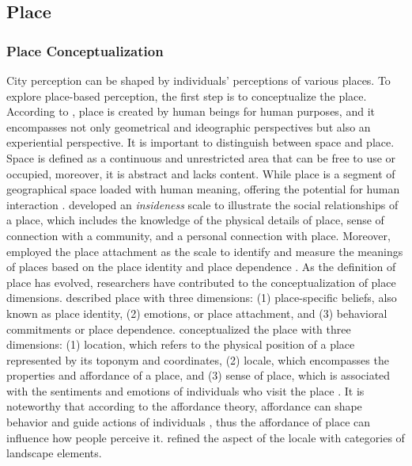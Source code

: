 \documentclass{article}
\begin{document}
\subsection{Place}
\subsubsection{Place Conceptualization}
City perception can be shaped by individuals' perceptions of various places. To explore place-based perception, the first step is to conceptualize the place. According to \cite{tuan_place_1975}, place is created by human beings for human purposes, and it encompasses not only geometrical and ideographic perspectives but also an experiential perspective. It is important to distinguish between space and place. Space is defined as a continuous and unrestricted area that can be free to use or occupied, moreover, it is abstract and lacks content. While place is a segment of geographical space loaded with human meaning, offering the potential for human interaction \citep{tuan_place_1975, agnew_space_2011, cresswell_place_2014}. \cite{relph_place_1976} developed an \textit{insideness} scale to illustrate the social relationships of a place, which includes the knowledge of the physical details of place, sense of connection with a community, and a personal connection with place. Moreover, \cite{williams_measurement_2003} employed the place attachment \citep{altman_place_1992} as the scale to identify and measure the meanings of places based on the place identity \citep{proshansky_city_1978,proshansky_place_1983} and place dependence \citep{stokols_people_1981}. As the definition of place has evolved, researchers have contributed to the conceptualization of place dimensions. \cite{jorgensen_comparative_2006} described place with three dimensions: (1) place-specific beliefs, also known as place identity, (2) emotions, or place attachment, and (3) behavioral commitments or place dependence. \cite{agnew_space_2011} conceptualized the place with three dimensions: (1) location, which refers to the physical position of a place represented by its toponym and coordinates, (2) locale, which encompasses the properties and affordance of a place, and (3) sense of place, which is associated with the sentiments and emotions of individuals who visit the place \citep{bahrehdar_description_2018}. It is noteworthy that according to the affordance theory, affordance can shape behavior and guide actions of individuals \citep{gibson_theory_1977}, thus the affordance of place can influence how people perceive it. \cite{wartmann_characterizing_2016,wartmann_describing_2018} refined the aspect of the locale with categories of landscape elements.
\end{document}
